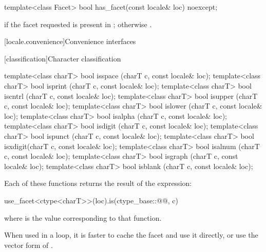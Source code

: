 %
\begin{itemdecl}
template<class Facet> bool has_facet(const locale& loc) noexcept;
\end{itemdecl}

\begin{itemdescr}
\pnum
\returns
{} if the facet requested is present in ;
otherwise .
\end{itemdescr}

[locale.convenience]{Convenience interfaces}

[classification]{Character classification}

%
%
%
%
%
%
%
%
%
%
%
%
\begin{itemdecl}
template<class charT> bool isspace (charT c, const locale& loc);
template<class charT> bool isprint (charT c, const locale& loc);
template<class charT> bool iscntrl (charT c, const locale& loc);
template<class charT> bool isupper (charT c, const locale& loc);
template<class charT> bool islower (charT c, const locale& loc);
template<class charT> bool isalpha (charT c, const locale& loc);
template<class charT> bool isdigit (charT c, const locale& loc);
template<class charT> bool ispunct (charT c, const locale& loc);
template<class charT> bool isxdigit(charT c, const locale& loc);
template<class charT> bool isalnum (charT c, const locale& loc);
template<class charT> bool isgraph (charT c, const locale& loc);
template<class charT> bool isblank (charT c, const locale& loc);
\end{itemdecl}

\pnum
Each of these functions 
returns the result of the expression:
\begin{codeblock}
use_facet<ctype<charT>>(loc).is(ctype_base::@@, c)
\end{codeblock}
where  is the  value
corresponding to that function.
\begin{footnote}
When used in a loop,
it is faster to cache the  facet and use it directly, or
use the vector form of .
\end{footnote}

